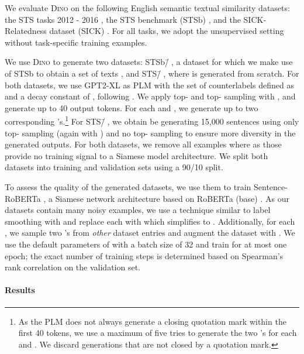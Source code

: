\documentclass[11pt]{article}
\newcommand\ours{\textsc{Dino}}
\newcommand\ourDsFull{STS\=/🦕}
\newcommand\ourDsSemi{STSb\=/🦕}
\begin{document}
We evaluate \ours{} on the following English semantic
textual similarity datasets: the STS tasks 2012 -
2016 \citep{10.5555/2387636.2387697,agirre-etal-2013-sem,agirre-etal-2014-semeval,agirre-etal-2015-semeval,agirre-etal-2016-semeval},
the STS benchmark (STSb) \citep{cer-etal-2017-semeval}, and
the SICK-Relatedness dataset
(SICK) \citep{marelli-etal-2014-sick}. For all tasks, we
adopt the unsupervised setting without task-specific training examples.

We use \ours{} to generate two datasets: \ourDsSemi, a
dataset for which we make use of STSb to obtain a set of
texts , and \ourDsFull{}, where  is generated from
scratch. For both datasets, we use GPT2-XL as PLM with the
set of counterlabels defined as 
and a decay constant of ,
following \citet{schick2021selfdiagnosis}. We apply
top- \citep{Holtzman2020The} and
top- \citep{fan-etal-2018-hierarchical,holtzman-etal-2018-learning}
sampling with ,  and generate up to 40
output tokens. For each  and , we generate up to two corresponding
's.\footnote{As the PLM does not always
generate a closing quotation mark within the first 40
tokens, we use a maximum of five tries to generate the two
's for each  and . We discard
generations that are not closed by a quotation mark.} For \ourDsFull{}, we obtain  be generating 15,000 sentences using only top- sampling (again with ) and no top- sampling to ensure more diversity in the generated outputs. For both datasets, we remove all examples where  as those provide no training signal to a Siamese model architecture. We split both datasets into training and validation sets using a 90/10 split.

To assess the quality of the generated datasets, we use them to train Sentence-RoBERTa \citep{reimers-gurevych-2019-sentence}, a Siamese network architecture based on RoBERTa (base) \citep{liu2019roberta}. As our datasets contain many noisy examples, we use a technique similar to label smoothing \citep{szegedy2016rethinking} with  and replace each  with
 which simplifies to .
Additionally, for each , we sample two
's from \emph{other} dataset entries and
augment the dataset with . We use the default parameters
of \citet{reimers-gurevych-2019-sentence} with a batch size
of 32 and train for at most one epoch; the exact number of
training steps is determined based on Spearman's rank correlation on the validation set.

\paragraph{Results}
\end{document}
